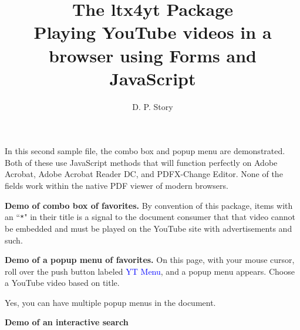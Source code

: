 \documentclass{article}
\title{The \texorpdfstring{\textsf{ltx4yt} Package\\[3pt]}{ltx4yt Package: }Playing YouTube videos in a browser using Forms and JavaScript}
\author{D. P. Story}
\begin{document}
\maketitle

In this second sample file, the combo box and popup menu are
demonstrated. Both of these use JavaScript methods that will
function perfectly on \textsf{Adobe Acrobat}, \textsf{Adobe
Acrobat Reader DC}, and \textsf{PDFX-Change Editor}. None of the fields
work within the native PDF viewer of modern browsers.

\textbf{Demo of combo box of favorites.} By convention of this
package, items with an ``\texttt{*}" in their title is a signal to
the document consumer that that video cannot be
embedded and must be played on the YouTube site with
advertisements and such. \vspace{-\parskip}
\begin{quote}
\olBdry
\end{quote}

\textbf{Demo of a popup menu of favorites.}
On this page, with your mouse cursor, roll over the push button labeled \textcolor{blue}{\textsf{YT Menu}}, and a popup
menu appears. Choose a YouTube video based on title.

 Yes, you can have multiple popup menus in the document.

\textbf{Demo of an interactive search}\\[3pt]
\ytInputQuery{1.5in}{11bp}\olBdry
\ytSearch{}{11bp}\olBdry
\ytClearQuery{}{11bp}
\end{document}
